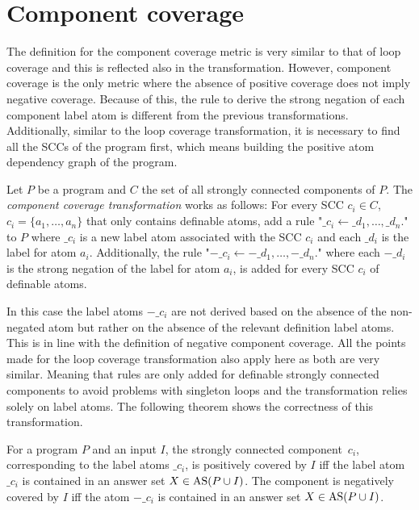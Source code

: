 \section{Component coverage}
\label{sec:Computing coverage metrics for propositional programs/Component coverage}
The definition for the component coverage metric is very similar to that of loop coverage and this is reflected also in the transformation. However, component coverage is the only metric where the absence of positive coverage does not imply negative coverage. Because of this, the rule to derive the strong negation of each component label atom is different from the previous transformations. Additionally, similar to the loop coverage transformation, it is necessary to find all the SCCs of the program first, which means building the positive atom dependency graph of the program.

\begin{definition}
\label{def:component transformation}
    Let $P$ be a program and $C$ the set of all strongly connected components of $P$. The \emph{component coverage transformation} works as follows: For every SCC \(c_i \in C\), \(c_i = \{a_1, \ldots, a_n\}\) that only contains definable atoms, add a rule "\(\_c_i \leftarrow \_d_1, \ldots, \_d_n.\)" to $P$ where $\_c_i$ is a new label atom associated with the SCC $c_i$ and each $\_d_i$ is the label for atom $a_i$. Additionally, the rule "\(-\_c_i \leftarrow -\_d_1, \ldots, -\_d_n.\)" where each $-\_d_i$ is the strong negation of the label for atom $a_i$, is added for every SCC $c_i$ of definable atoms.
\end{definition}

In this case the label atoms $-\_c_i$ are not derived based on the absence of the non-negated atom but rather on the absence of the relevant definition label atoms. This is in line with the definition of negative component coverage. All the points made for the loop coverage transformation also apply here as both are very similar. Meaning that rules are only added for definable strongly connected components to avoid problems with singleton loops and the transformation relies solely on label atoms. The following theorem shows the correctness of this transformation. 

\begin{theorem}
\label{th:component transformation}
    For a program $P$ and an input $I$, the strongly connected component~$c_i$, corresponding to the label atoms $\_c_i$, is positively covered by $I$ iff the label atom $\_c_i$ is contained in an answer set \(X \in \operatorname{AS}(P \cup I)\). The component is negatively covered by $I$ iff the atom $-\_c_i$ is contained in an answer set \(X \in \operatorname{AS}(P \cup I)\).
\end{theorem}


